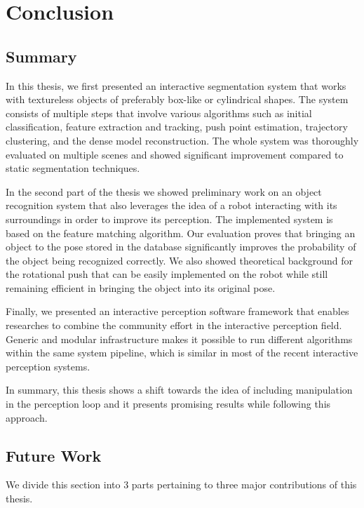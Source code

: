 \chapter{Conclusion}
\label{chapter:conclusion}

\section{Summary}

In this thesis, we first presented an interactive segmentation system that works with textureless objects of preferably box-like or cylindrical shapes. The system consists of multiple steps that involve various algorithms such as initial classification, feature extraction and tracking, push point estimation, trajectory clustering, and the dense model reconstruction. The whole system was thoroughly evaluated on multiple scenes and showed significant improvement compared to static segmentation techniques.

In the second part of the thesis we showed preliminary work on an object recognition system that also leverages the idea of a robot interacting with its surroundings in order to improve its perception. The implemented system is based on the feature matching algorithm. Our evaluation proves that bringing an object to the pose stored in the database significantly improves the probability of the object being recognized correctly. We also showed theoretical background for the rotational push that can be easily implemented on the robot while still remaining efficient in bringing the object into its original pose. 

Finally, we presented an interactive perception software framework that enables researches to combine the community effort in the interactive perception field. Generic and modular infrastructure makes it possible to run different algorithms within the same system pipeline, which is similar in most of the recent interactive perception systems.

In summary, this thesis shows a shift towards the idea of including manipulation in the perception loop and it presents promising results while following this approach. 


\section{Future Work}
We divide this section into 3 parts pertaining to three major contributions of this thesis.

